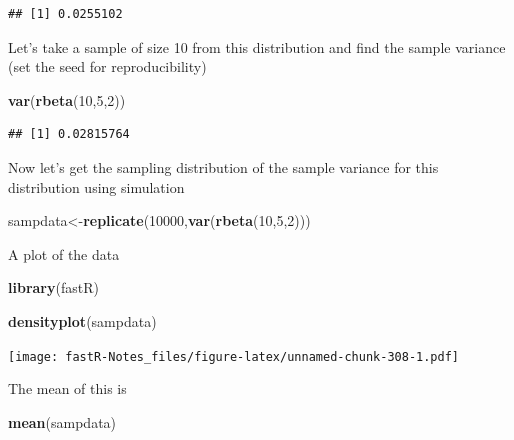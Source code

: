 \documentclass[]{book}
\newenvironment{Shaded}{\begin{snugshade}}{\end{snugshade}}
\newcommand{\KeywordTok}[1]{\textcolor[rgb]{0.13,0.29,0.53}{\textbf{#1}}}
\newcommand{\DecValTok}[1]{\textcolor[rgb]{0.00,0.00,0.81}{#1}}
\newcommand{\NormalTok}[1]{#1}
\theoremstyle{definition}
\theoremstyle{definition}
\theoremstyle{definition}
\theoremstyle{remark}
\begin{document}
\begin{verbatim}
## [1] 0.0255102
\end{verbatim}

Let's take a sample of size 10 from this distribution and find the
sample variance (set the seed for reproducibility)

\begin{Shaded}
\begin{Highlighting}[]
\KeywordTok{var}\NormalTok{(}\KeywordTok{rbeta}\NormalTok{(}\DecValTok{10}\NormalTok{,}\DecValTok{5}\NormalTok{,}\DecValTok{2}\NormalTok{))}
\end{Highlighting}
\end{Shaded}

\begin{verbatim}
## [1] 0.02815764
\end{verbatim}

Now let's get the sampling distribution of the sample variance for this
distribution using simulation

\begin{Shaded}
\begin{Highlighting}[]
\NormalTok{sampdata<-}\KeywordTok{replicate}\NormalTok{(}\DecValTok{10000}\NormalTok{,}\KeywordTok{var}\NormalTok{(}\KeywordTok{rbeta}\NormalTok{(}\DecValTok{10}\NormalTok{,}\DecValTok{5}\NormalTok{,}\DecValTok{2}\NormalTok{)))}
\end{Highlighting}
\end{Shaded}

A plot of the data

\begin{Shaded}
\begin{Highlighting}[]
\KeywordTok{library}\NormalTok{(fastR)}
\end{Highlighting}
\end{Shaded}

\begin{Shaded}
\begin{Highlighting}[]
\KeywordTok{densityplot}\NormalTok{(sampdata)}
\end{Highlighting}
\end{Shaded}

\texttt{[image: fastR-Notes\_files/figure-latex/unnamed-chunk-308-1.pdf]}

The mean of this is

\begin{Shaded}
\begin{Highlighting}[]
\KeywordTok{mean}\NormalTok{(sampdata)}
\end{Highlighting}
\end{Shaded}
\end{document}
